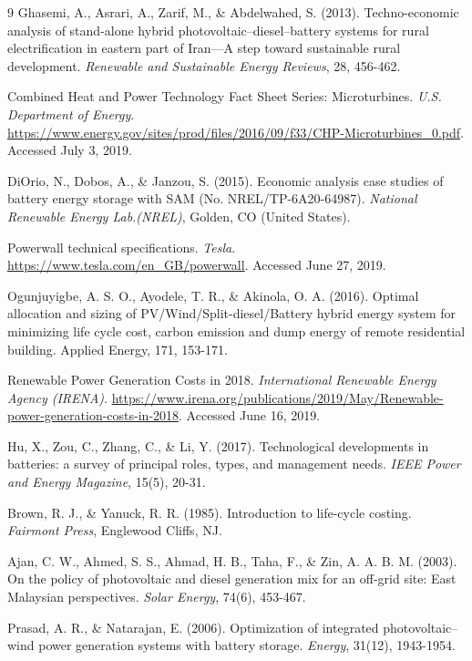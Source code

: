 \documentclass[final,3p,times]{elsarticle}
\begin{document}
\begin{thebibliography}{9}
Ghasemi, A., Asrari, A., Zarif, M., \& Abdelwahed, S. (2013). Techno-economic analysis of stand-alone hybrid photovoltaic–diesel–battery systems for rural electrification in eastern part of Iran—A step toward sustainable rural development. \textit{Renewable and Sustainable Energy Reviews}, 28, 456-462.

Combined Heat and Power Technology Fact Sheet Series: Microturbines. \textit{U.S. Department of Energy}. \url{https://www.energy.gov/sites/prod/files/2016/09/f33/CHP-Microturbines_0.pdf}. Accessed July 3, 2019. 

DiOrio, N., Dobos, A., \& Janzou, S. (2015). Economic analysis case studies of battery energy storage with SAM (No. NREL/TP-6A20-64987). \textit{National Renewable Energy Lab.(NREL)}, Golden, CO (United States).

Powerwall technical specifications. \textit{Tesla}. \url{https://www.tesla.com/en_GB/powerwall}. Accessed June 27, 2019. 

Ogunjuyigbe, A. S. O., Ayodele, T. R., \& Akinola, O. A. (2016). Optimal allocation and sizing of PV/Wind/Split-diesel/Battery hybrid energy system for minimizing life cycle cost, carbon emission and dump energy of remote residential building. Applied Energy, 171, 153-171.

Renewable Power Generation Costs in 2018. \textit{International Renewable Energy Agency (IRENA)}. \url{https://www.irena.org/publications/2019/May/Renewable-power-generation-costs-in-2018}. Accessed June 16, 2019.

Hu, X., Zou, C., Zhang, C., \& Li, Y. (2017). Technological developments in batteries: a survey of principal roles, types, and management needs. \textit{IEEE Power and Energy Magazine}, 15(5), 20-31.

Brown, R. J., \& Yanuck, R. R. (1985). Introduction to life-cycle costing. \textit{Fairmont Press}, Englewood Cliffs, NJ.

Ajan, C. W., Ahmed, S. S., Ahmad, H. B., Taha, F., \& Zin, A. A. B. M. (2003). On the policy of photovoltaic and diesel generation mix for an off-grid site: East Malaysian perspectives. \textit{Solar Energy}, 74(6), 453-467.

Prasad, A. R., \& Natarajan, E. (2006). Optimization of integrated photovoltaic–wind power generation systems with battery storage. \textit{Energy}, 31(12), 1943-1954.


\end{thebibliography}
\end{document}
